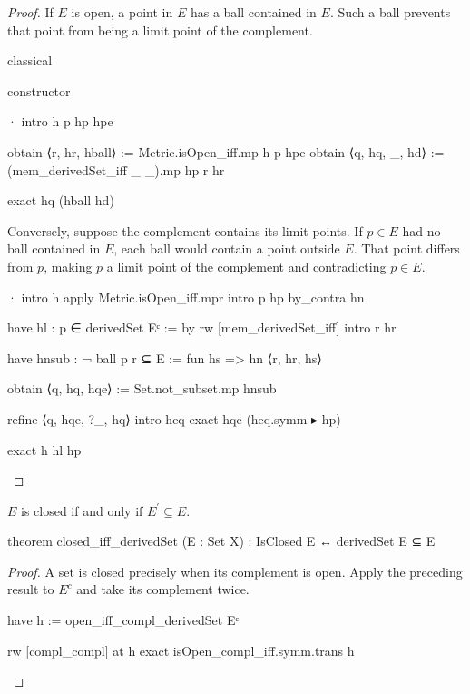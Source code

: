 \begin{proof}
  If $E$ is open, a point in $E$ has a ball contained in $E$.
  Such a ball prevents that point from being a limit point of the complement.

  \begin{lean}
    classical

    constructor

    · intro h p hp hpe

      obtain ⟨r, hr, hball⟩ := Metric.isOpen_iff.mp h p hpe
      obtain ⟨q, hq, _, hd⟩ := (mem_derivedSet_iff _ _).mp hp r hr

      exact hq (hball hd)
  \end{lean}

  Conversely, suppose the complement contains its limit points.
  If $p\in E$ had no ball contained in $E$, each ball would contain a point outside $E$.
  That point differs from $p$, making $p$ a limit point of the complement and contradicting $p\in
    E$.

  \begin{lean}
    · intro h
      apply Metric.isOpen_iff.mpr
      intro p hp
      by_contra hn

      have hl : p ∈ derivedSet Eᶜ := by
        rw [mem_derivedSet_iff]
        intro r hr

        have hnsub : ¬ ball p r ⊆ E := fun hs => hn ⟨r, hr, hs⟩

        obtain ⟨q, hq, hqe⟩ := Set.not_subset.mp hnsub

        refine ⟨q, hqe, ?_, hq⟩
        intro heq
        exact hqe (heq.symm ▸ hp)

      exact h hl hp
  \end{lean}

\end{proof}

\begin{lemma}
  \label{ma:lem:closed-iff-limitPoints}
  $E$ is closed if and only if $E^{\prime}\subseteq E$.

  \begin{lean}
    theorem closed_iff_derivedSet (E : Set X) :
        IsClosed E ↔ derivedSet E ⊆ E
  \end{lean}
\end{lemma}

\begin{proof}
  A set is closed precisely when its complement is open.
  Apply the preceding result to $E^{c}$ and take its complement twice.

  \begin{lean}
    have h := open_iff_compl_derivedSet Eᶜ

    rw [compl_compl] at h
    exact isOpen_compl_iff.symm.trans h
  \end{lean}

\end{proof}

